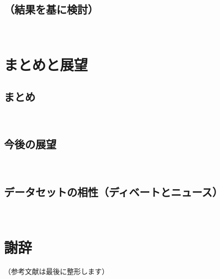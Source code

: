 \documentclass[12pt,a4j]{jreport}
\begin{document}
\section{（結果を基に検討）}
~

\chapter{まとめと展望}


\section{まとめ}
~

\section{今後の展望}
~%
 \section{データセットの相性（ディベートとニュース）}
~

\chapter*{謝辞}

（参考文献は最後に整形します）



\end{document}
